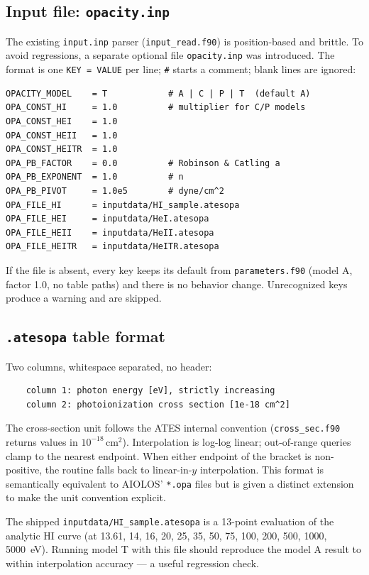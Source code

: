 \documentclass[english,a4paper]{kiseon_memo}
\begin{document}
\subsection{Input file: \texttt{opacity.inp}}

The existing \texttt{input.inp} parser (\texttt{input\_read.f90}) is
position-based and brittle. To avoid regressions, a separate optional file
\texttt{opacity.inp} was introduced. The format is one \texttt{KEY = VALUE}
per line; \texttt{\#} starts a comment; blank lines are ignored:

\begin{verbatim}
OPACITY_MODEL    = T            # A | C | P | T  (default A)
OPA_CONST_HI     = 1.0          # multiplier for C/P models
OPA_CONST_HEI    = 1.0
OPA_CONST_HEII   = 1.0
OPA_CONST_HEITR  = 1.0
OPA_PB_FACTOR    = 0.0          # Robinson & Catling a
OPA_PB_EXPONENT  = 1.0          # n
OPA_PB_PIVOT     = 1.0e5        # dyne/cm^2
OPA_FILE_HI      = inputdata/HI_sample.atesopa
OPA_FILE_HEI     = inputdata/HeI.atesopa
OPA_FILE_HEII    = inputdata/HeII.atesopa
OPA_FILE_HEITR   = inputdata/HeITR.atesopa
\end{verbatim}

If the file is absent, every key keeps its default from
\texttt{parameters.f90} (model A, factor 1.0, no table paths) and there is
no behavior change. Unrecognized keys produce a warning and are skipped.

\subsection{\texttt{.atesopa} table format}

Two columns, whitespace separated, no header:
\begin{verbatim}
    column 1: photon energy [eV], strictly increasing
    column 2: photoionization cross section [1e-18 cm^2]
\end{verbatim}

The cross-section unit follows the ATES internal convention
(\texttt{cross\_sec.f90} returns values in $10^{-18}\,\mathrm{cm}^2$).
Interpolation is log-log linear; out-of-range queries clamp to the nearest
endpoint. When either endpoint of the bracket is non-positive, the routine
falls back to linear-in-$y$ interpolation. This format is semantically
equivalent to AIOLOS' \texttt{*.opa} files but is given a distinct extension
to make the unit convention explicit.

The shipped \texttt{inputdata/HI\_sample.atesopa} is a 13-point evaluation of
the analytic HI curve (at 13.61, 14, 16, 20, 25, 35, 50, 75, 100, 200, 500,
1000, 5000~eV). Running model T with this file should reproduce the model A
result to within interpolation accuracy --- a useful regression check.
\end{document}
